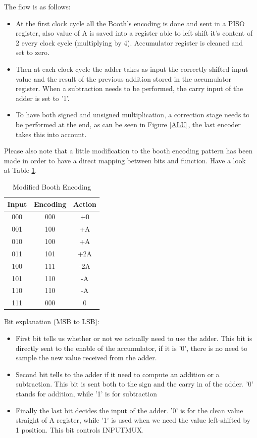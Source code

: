 \documentclass[12pt]{article}
\begin{document}
The flow is as follows:
\begin{itemize}
	\item At the first clock cycle all the Booth's encoding is done and sent in a PISO register, also value of A is saved into a register able to left shift it's content of 2 every clock cycle (multiplying by 4). Accumulator register is cleaned and set to zero.
	\item Then at each clock cycle the adder takes as input the correctly shifted input value and the result of the previous addition stored in the accumulator register. When a subtraction needs to be performed, the carry input of the adder is set to '1'.
	\item To have both signed and unsigned multiplication, a correction stage needs to be performed at the end, as can be seen in Figure \ref{ALU}, the last encoder takes this into account.
	
\end{itemize}


Please also note that a little modification to the booth encoding pattern has been made in order to have a direct mapping between bits and function. Have a look at Table \ref{BOOTHENC}.
\begin{table}
\begin{center}
	\begin{tabular}{ | c | c | c |}
		\hline
		\rowcolor{LimeGreen} Input & Encoding & Action \\ \hline
		000 & 000 & +0 \\ \hline
		001 & 100 & +A \\ \hline
		010 & 100 & +A \\ \hline
		011 & 101 & +2A \\ \hline
		100 & 111 & -2A \\ \hline
		101 & 110 & -A \\ \hline
		110 & 110 & -A \\ \hline
		111 & 000 & 0 \\ \hline
		
	\end{tabular}
	\caption{Modified Booth Encoding}
	\label{BOOTHENC}
\end{center}
\end{table}


Bit explanation (MSB to LSB):
\begin{itemize}
	\item First bit tells us whether or not we actually need to use the adder. This bit is directly sent to the enable of the accumulator, if it is '0', there is no need to sample the new value received from the adder.
	\item Second bit tells to the adder if it need to compute an addition or a subtraction. This bit is sent both to the sign and the carry in of the adder. '0' stands for addition, while '1' is for subtraction
	\item Finally the last bit decides the input of the adder. '0' is for the clean value straight of A register, while '1' is used when we need the value left-shifted by 1 position. This bit controls INPUTMUX.
\end{itemize}
\end{document}

